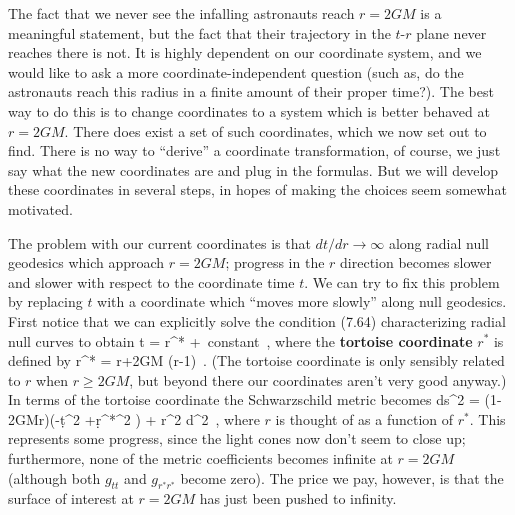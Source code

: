 The fact that we never see the infalling astronauts reach $r=2GM$
is a meaningful statement, but the fact that their trajectory in
the $t$-$r$ plane never reaches there is not.  It is highly dependent
on our coordinate system, and we would like to ask a more 
coordinate-independent question (such as, do the astronauts reach
this radius in a finite amount of their proper time?).  The best
way to do this is to change coordinates to a system which is better
behaved at $r=2GM$.
There does exist a set of such coordinates, which we now set out to
find.  There is no way to ``derive'' a coordinate transformation, of
course, we just say what the new coordinates are and plug in the
formulas.  But we will develop these coordinates in several steps,
in hopes of making the choices seem somewhat motivated.

The problem with our current coordinates is that
$dt/dr\rightarrow \infty$ along radial null geodesics which approach
$r=2GM$; progress in the $r$ direction becomes slower and slower with
respect to the coordinate time $t$.  We can try to fix this problem
by replacing $t$ with a coordinate which ``moves more slowly'' along
null geodesics.  First notice that we can explicitly solve the
condition (7.64) characterizing radial null curves to obtain
\be
  t = \pm r^* +{\rm ~constant}\ ,\label{7.65}
\ee
where the {\bf tortoise coordinate} $r^*$ is defined by
\be
  r^* = r+2GM \ln\left({{r}}-1\right)\ .\label{7.66}
\ee
(The tortoise coordinate is only sensibly related to $r$ when
$r\geq 2GM$, but beyond there our coordinates aren't very good
anyway.)  In terms of 
the tortoise coordinate the Schwarzschild metric becomes
\be
  ds^2 = \left(1-{{2GM}\over r}\right)\left(-\d t^2 
  +\d {r^*}^2 \right) + r^2 d\Omega^2\ ,\label{7.67}
\ee
where $r$ is thought of as a function of $r^*$.
This represents some progress, since the light cones now don't
seem to close up; furthermore, none of the metric coefficients becomes
infinite at $r=2GM$ (although both $g_{tt}$ and $g_{r^* r^*}$ become
zero).  The price we pay, however, is that the surface
of interest at $r=2GM$ has just been pushed to infinity.

\begin{figure}
  \centerline{
  }
\end{figure}

